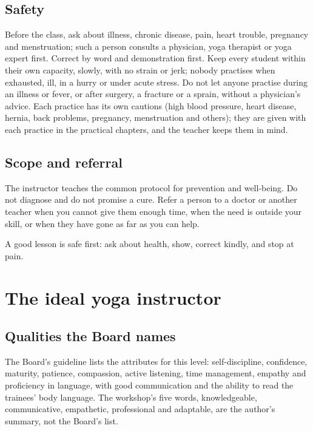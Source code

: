 \subsection*{Safety}
Before the class, ask about illness, chronic disease, pain, heart trouble, pregnancy and menstruation; such a person consults a physician, yoga therapist or yoga expert first. Correct by word and demonstration first. Keep every student within their own capacity, slowly, with no strain or jerk; nobody practises when exhausted, ill, in a hurry or under acute stress. Do not let anyone practise during an illness or fever, or after surgery, a fracture or a sprain, without a physician's advice. Each practice has its own cautions (high blood pressure, heart disease, hernia, back problems, pregnancy, menstruation and others); they are given with each practice in the practical chapters, and the teacher keeps them in mind.

\subsection*{Scope and referral}
The instructor teaches the common protocol for prevention and well-being. Do not diagnose and do not promise a cure. Refer a person to a doctor or another teacher when you cannot give them enough time, when the need is outside your skill, or when they have gone as far as you can help.

\begin{caution}
A good lesson is safe first: ask about health, show, correct kindly, and stop at pain.
\end{caution}


\section{The ideal yoga instructor}

\subsection*{Qualities the Board names}
The Board's guideline lists the attributes for this level: self-discipline, confidence, maturity, patience, compassion, active listening, time management, empathy and proficiency in language, with good communication and the ability to read the trainees' body language. The workshop's five words, knowledgeable, communicative, empathetic, professional and adaptable, are the author's summary, not the Board's list.

